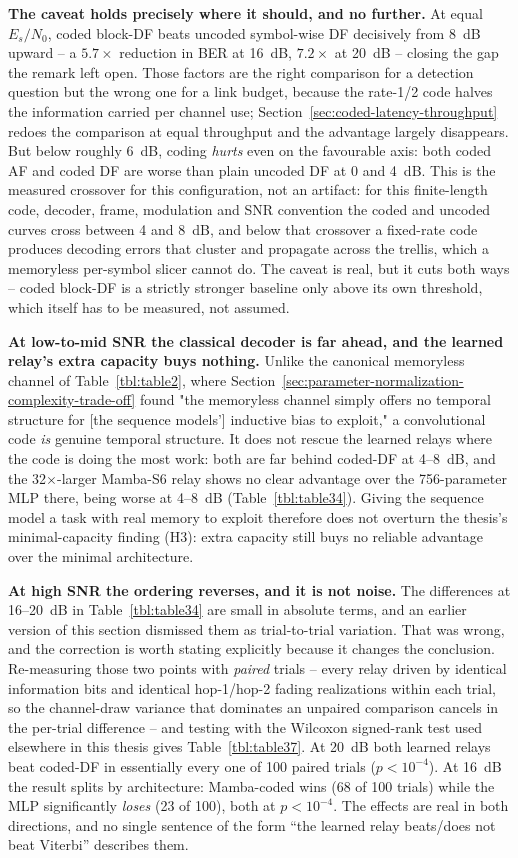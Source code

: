 \textbf{The caveat holds precisely where it should, and no further.} At equal $E_s/N_0$, coded block-DF beats uncoded symbol-wise DF decisively from 8~dB upward -- a $5.7\times$ reduction in BER at 16~dB, $7.2\times$ at 20~dB -- closing the gap the remark left open. Those factors are the right comparison for a detection question but the wrong one for a link budget, because the rate-1/2 code halves the information carried per channel use; Section~\ref{sec:coded-latency-throughput} redoes the comparison at equal throughput and the advantage largely disappears. But below roughly 6~dB, coding \emph{hurts} even on the favourable axis: both coded AF and coded DF are worse than plain uncoded DF at 0 and 4~dB. This is the measured crossover for this configuration, not an artifact: for this finite-length code, decoder, frame, modulation and SNR convention the coded and uncoded curves cross between 4 and 8~dB, and below that crossover a fixed-rate code produces decoding errors that cluster and propagate across the trellis, which a memoryless per-symbol slicer cannot do. The caveat is real, but it cuts both ways -- coded block-DF is a strictly stronger baseline only above its own threshold, which itself has to be measured, not assumed.

\textbf{At low-to-mid SNR the classical decoder is far ahead, and the learned relay's extra capacity buys nothing.} Unlike the canonical memoryless channel of Table~\ref{tbl:table2}, where Section~\ref{sec:parameter-normalization-complexity-trade-off} found "the memoryless channel simply offers no temporal structure for [the sequence models'] inductive bias to exploit," a convolutional code \emph{is} genuine temporal structure. It does not rescue the learned relays where the code is doing the most work: both are far behind coded-DF at 4--8~dB, and the 32$\times$-larger Mamba-S6 relay shows no clear advantage over the 756-parameter MLP there, being worse at 4--8~dB (Table~\ref{tbl:table34}). Giving the sequence model a task with real memory to exploit therefore does not overturn the thesis's minimal-capacity finding (H3): extra capacity still buys no reliable advantage over the minimal architecture.

\textbf{At high SNR the ordering reverses, and it is not noise.} The differences at 16--20~dB in Table~\ref{tbl:table34} are small in absolute terms, and an earlier version of this section dismissed them as trial-to-trial variation. That was wrong, and the correction is worth stating explicitly because it changes the conclusion. Re-measuring those two points with \emph{paired} trials -- every relay driven by identical information bits and identical hop-1/hop-2 fading realizations within each trial, so the channel-draw variance that dominates an unpaired comparison cancels in the per-trial difference -- and testing with the Wilcoxon signed-rank test used elsewhere in this thesis gives Table~\ref{tbl:table37}. At 20~dB both learned relays beat coded-DF in essentially every one of 100 paired trials ($p<10^{-4}$). At 16~dB the result splits by architecture: Mamba-coded wins (68 of 100 trials) while the MLP significantly \emph{loses} (23 of 100), both at $p<10^{-4}$. The effects are real in both directions, and no single sentence of the form ``the learned relay beats/does not beat Viterbi'' describes them.

